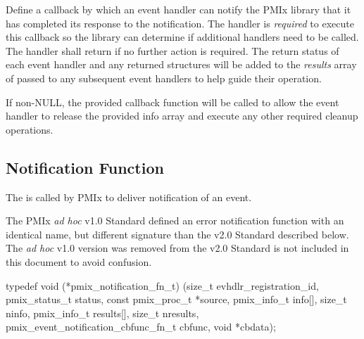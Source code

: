 \begin{arglist}
\end{arglist}

\descr

Define a callback by which an event handler can notify the \ac{PMIx} library that it has completed its response to the notification. The handler is \textit{required} to execute this callback so the library can determine if additional handlers need to be called. The handler shall return  if no further action is required. The return status of each event handler and any returned  structures will be added to the \textit{results} array of  passed to any subsequent event handlers to help guide their operation.

If non-NULL, the provided callback function will be called to allow the event handler to release the provided info array and execute any other required cleanup operations.


\subsection{Notification Function}

\summary

The  is called by \ac{PMIx} to deliver notification of an event.

\adviceuserstart
The \ac{PMIx} \textit{ad hoc} v1.0 Standard defined an error notification function with an identical name, but different signature than the v2.0 Standard described below. The \textit{ad hoc} v1.0 version was removed from the v2.0 Standard is not included in this document to avoid confusion.
\adviceuserend


\cspecificstart
\begin{codepar}
typedef void (*pmix_notification_fn_t)
    (size_t evhdlr_registration_id,
     pmix_status_t status,
     const pmix_proc_t *source,
     pmix_info_t info[], size_t ninfo,
     pmix_info_t results[], size_t nresults,
     pmix_event_notification_cbfunc_fn_t cbfunc,
     void *cbdata);
\end{codepar}
\cspecificend


